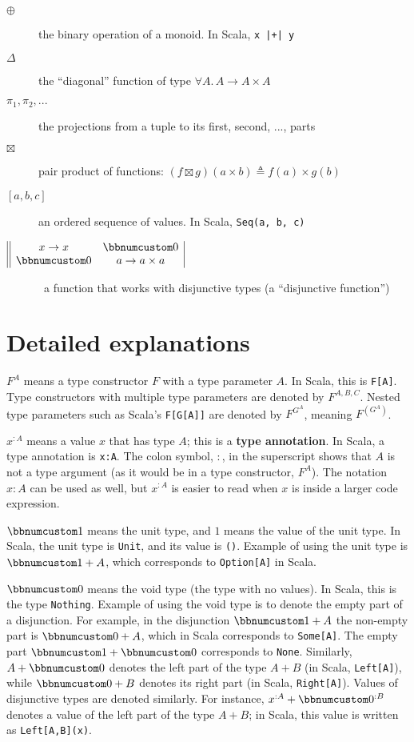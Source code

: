 \begin{description}
\item [{$\oplus$}] the binary operation of a monoid. In Scala, \lstinline!x |+| y!
\item [{$\Delta$}] the \textsf{``}diagonal\textsf{''} function of type $\forall A.\,A\rightarrow A\times A$
\item [{$\pi_{1},\pi_{2},...$}] the projections from a tuple to its first,
second, ..., parts
\item [{$\boxtimes$}] pair product of functions: $(f\boxtimes g)(a\times b)\triangleq f(a)\times g(b)$
\item [{$\left[a,b,c\right]$}] an ordered sequence of values. In Scala,
\lstinline!Seq(a, b, c)!
\item [{$\begin{array}{||cc|}
x\rightarrow x & \bbnum 0\\
\bbnum 0 & a\rightarrow a\times a
\end{array}$}] ~a function that works with disjunctive types (a \textsf{``}disjunctive
function\textsf{''})
\end{description}

\section{Detailed explanations}

$F^{A}$ means a type constructor $F$ with a type parameter $A$.
In Scala, this is \lstinline!F[A]!. Type constructors with multiple
type parameters are denoted by $F^{A,B,C}$. Nested type parameters
such as Scala\textsf{'}s \lstinline!F[G[A]]! are denoted by $F^{G^{A}}$,
meaning $F^{(G^{A})}$.

$x^{:A}$ means a value $x$ that has type $A$; this is a \textbf{type
annotation}. In Scala, a type annotation is \lstinline!x:A!. The
colon symbol, $:$, in the superscript shows that $A$ is not a type
argument (as it would be in a type constructor, $F^{A}$). The notation
$x:A$ can be used as well, but $x^{:A}$ is easier to read when $x$
is inside a larger code expression. 

$\bbnum 1$ means the unit type, and $1$ means
the value of the unit type. In Scala, the unit type is \lstinline!Unit!,
and its value is \lstinline!()!. Example of using the unit type is
$\bbnum 1+A$, which corresponds to \lstinline!Option[A]! in Scala.

$\bbnum 0$ means the void type (the type with no
values). In Scala, this is the type \lstinline!Nothing!. Example
of using the void type is to denote the empty part of a disjunction.
For example, in the disjunction $\bbnum 1+A$ the non-empty part is
$\bbnum 0+A$, which in Scala corresponds to \lstinline!Some[A]!.
The empty part $\bbnum 1+\bbnum 0$ corresponds to \lstinline!None!.
Similarly, $A+\bbnum 0$ denotes the left part of the type $A+B$
(in Scala, \lstinline!Left[A]!), while $\bbnum 0+B$ denotes its
right part (in Scala, \lstinline!Right[A]!). Values of disjunctive
types are denoted similarly. For instance, $x^{:A}+\bbnum 0^{:B}$
denotes a value of the left part of the type $A+B$; in Scala, this
value is written as \lstinline!Left[A,B](x)!.

